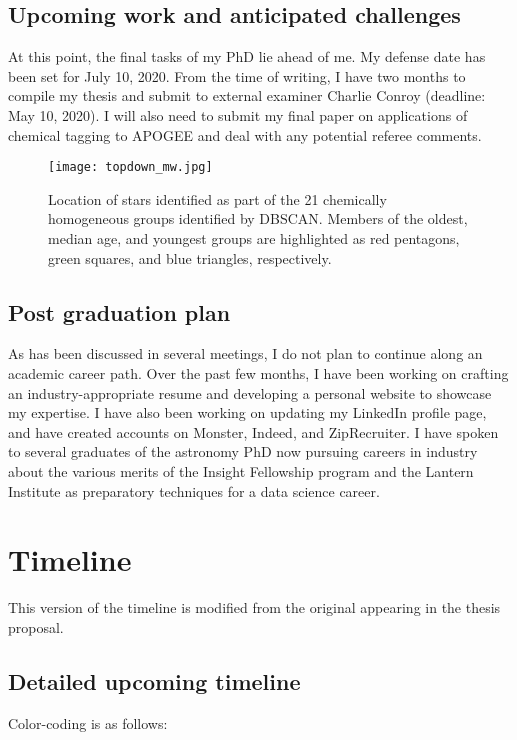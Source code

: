 \documentclass[11pt]{article}
\begin{document}
    
    \subsection*{Upcoming work and anticipated challenges}
    
    At this point, the final tasks of my PhD lie ahead of me. My defense date has been set for July 10, 2020. From the time of writing, I have two months to compile my thesis and submit to external examiner Charlie Conroy (deadline: May 10, 2020). I will also need to submit my final paper on applications of chemical tagging to APOGEE and deal with any potential referee comments.
    
\begin{figure}[h]
\centering
\texttt{[image: topdown\_mw.jpg]}
\caption{Location of stars identified as part of the 21 chemically homogeneous groups identified by DBSCAN. Members of the oldest, median age, and youngest groups are highlighted as red pentagons, green squares, and blue triangles, respectively.}
\label{fig:mw}
\end{figure}

	\subsection*{Post graduation plan}
	
	As has been discussed in several meetings, I do not plan to continue along an academic career path. Over the past few months, I have been working on crafting an industry-appropriate resume and developing a personal website to showcase my expertise. I have also been working on updating my LinkedIn profile page, and have created accounts on Monster, Indeed, and ZipRecruiter. I have spoken to several graduates of the astronomy PhD now pursuing careers in industry about the various merits of the Insight Fellowship program and the Lantern Institute as preparatory techniques for a data science career.

\section*{Timeline}

This version of the timeline is modified from the original appearing in the thesis proposal. 

\subsection*{Detailed upcoming timeline}
Color-coding is as follows:
    
\end{document}
